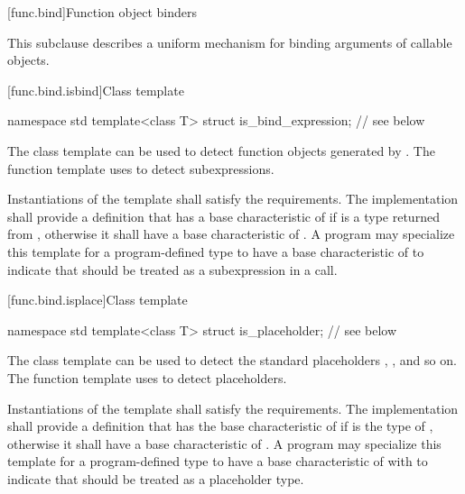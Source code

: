 [func.bind]{Function object binders}%

\pnum
This subclause describes a uniform mechanism for binding
arguments of callable objects.

[func.bind.isbind]{Class template }

%
\begin{codeblock}
namespace std {
  template<class T> struct is_bind_expression;  // see below
}
\end{codeblock}

\pnum
The class template  can be used to detect function objects
generated by . The function template 
uses  to detect subexpressions.

\pnum
Instantiations of the  template shall satisfy
the  requirements. The implementation
shall provide a definition that has a base characteristic of
 if  is a type returned from ,
otherwise it shall have a base characteristic of .
A program may specialize this template for a program-defined type 
to have a base characteristic of  to indicate that
 should be treated as a subexpression in a  call.

[func.bind.isplace]{Class template }

%
\begin{codeblock}
namespace std {
  template<class T> struct is_placeholder;      // see below
}
\end{codeblock}

\pnum
The class template  can be used to detect the standard placeholders
, , and so on. The function template  uses
 to detect placeholders.

\pnum
Instantiations of the  template shall satisfy
the  requirements. The implementation
shall provide a definition that has the base characteristic of
 if  is the type of
, otherwise it shall have a
base characteristic of . A program
may specialize this template for a program-defined type  to
have a base characteristic of 
with  to indicate that  should be
treated as a placeholder type.

